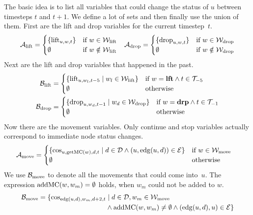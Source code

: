 The basic idea is to list all variables that could change the status of $u$
between timesteps $t$ and $t+1$. We define a lot of sets and then finally use
the union of them. First are the lift and drop variables for the
current timestep~$t$.
\begin{align}
    &\mathcal{A}_{\mathrm{lift}} = \begin{cases}
        \{\mathrm{lift}_{u,w,t}\} &\text{if}\  w \in \mathcal{W}_\mathrm{lift}\\
        \emptyset &\text{if}\  w \notin \mathcal{W}_\mathrm{lift}
    \end{cases}
    &\mathcal{A}_{\mathrm{drop}} = \begin{cases}
        \{\mathrm{drop}_{u,w,t}\} &\text{if}\  w \in \mathcal{W}_\mathrm{drop}\\
        \emptyset &\text{if}\  w \notin \mathcal{W}_\mathrm{drop}
    \end{cases}
\end{align}
Next are the lift and drop variables that happened in the past.
\begin{align}
    \mathcal{B}_{\mathrm{lift}} &= \begin{cases}
        \{\mathrm{lift}_{u,w_l,t-5} \mid w_l \in \mathcal{W}_\mathrm{lift}\} &\text{if}\  w = \text{\bf lft} \wedge
        t \in \mathcal{T}_{-5}\\
        \emptyset &\text{otherwise}
    \end{cases}\\
    \mathcal{B}_{\mathrm{drop}} &= \begin{cases}
        \{\mathrm{drop}_{u,w_d,t-1} \mid w_d \in \mathcal{W}_\mathrm{drop}\} &\text{if}\  w = \text{\bf drp} \wedge
        t \in \mathcal{T}_{-1}\\
        \emptyset &\text{otherwise}
    \end{cases}
\end{align}
Now there are the movement variables. Only continue and stop variables actually
correspond to immediate node status changes.
\begin{align}
    \mathcal{A}_{\mathrm{move}} &= \begin{cases}
        \{\mathrm{cos}_{u,\mathrm{getMC}(w),d,t} \mid d \in \mathcal{D} \wedge (u,\mathrm{edg}(u,d)) \in \mathcal{E}\} &\text{if}\ 
         w \in \mathcal{W}_\mathrm{move}\\
        \emptyset &\text{otherwise}
    \end{cases}
\end{align}
We use $\mathcal{B}_{\mathrm{move}}$ to denote all the movements that could come
into~$u$. The expression $\mathrm{addMC}(w,w_m) = \emptyset$ holds, when $w_m$ could
not be added to $w$.
\begin{align}
    \begin{split}
    \mathcal{B}_{\mathrm{move}} =
    \{\mathrm{cos}_{\mathrm{edg}(u,d),w_m,d+2,t} &\mid d \in \mathcal{D},  w_m \in \mathcal{W}_\mathrm{move}\\
        &\wedge \mathrm{addMC}(w,w_m) \neq \emptyset \wedge  (\mathrm{edg}(u,d),u) \in \mathcal{E}\}
    \end{split}
\end{align}
